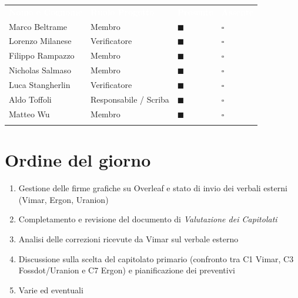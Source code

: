 \documentclass[12pt,a4paper]{article}
\newcommand{\tightlist}{\setlength{\itemsep}{1pt}\setlength{\parskip}{0pt}}
\begin{document}
\begin{center}
\begin{tabularx}{\linewidth}{>{\raggedright\arraybackslash}X>{\centering\arraybackslash}X>{\centering\arraybackslash}p{2.2cm}>{\centering\arraybackslash}p{2.2cm}}
\rowcolor{bfblue}\textcolor{white}{\textbf{Nome e Cognome}} & \textcolor{white}{\textbf{Ruolo Progetto}} & \textcolor{white}{\textbf{Presente}} & \textcolor{white}{\textbf{Assente}} \\
Marco Beltrame & Membro & $\blacksquare$ & $\square$ \\ \arrayrulecolor{bfline}\hline
Lorenzo Milanese & Verificatore & $\blacksquare$ & $\square$ \\ \arrayrulecolor{bfline}\hline
Filippo Rampazzo & Membro & $\blacksquare$ & $\square$ \\ \arrayrulecolor{bfline}\hline
Nicholas Salmaso & Membro & $\blacksquare$ & $\square$ \\ \arrayrulecolor{bfline}\hline
Luca Stangherlin & Verificatore & $\blacksquare$ & $\square$ \\ \arrayrulecolor{bfline}\hline
Aldo Toffoli & Responsabile / Scriba & $\blacksquare$ & $\square$ \\ \arrayrulecolor{bfline}\hline
Matteo Wu & Membro & $\blacksquare$ & $\square$ \\ \arrayrulecolor{bfline}\hline
\end{tabularx}
\end{center}



\hypertarget{ordine-del-giorno}{%
\section{Ordine del giorno}}

\begin{enumerate}
\tightlist
\item Gestione delle firme grafiche su Overleaf e stato di invio dei verbali esterni (Vimar, Ergon, Uranion)
\item Completamento e revisione del documento di \emph{Valutazione dei Capitolati}
\item Analisi delle correzioni ricevute da Vimar sul verbale esterno
\item Discussione sulla scelta del capitolato primario (confronto tra C1 Vimar, C3 Fossdot/Uranion e C7 Ergon) e pianificazione dei preventivi
\item Varie ed eventuali
\end{enumerate}
\end{document}
